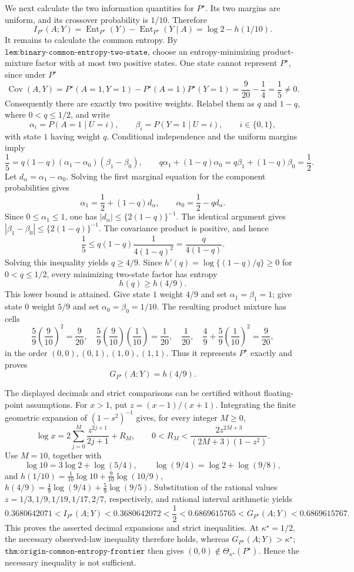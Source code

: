 We next calculate the two information quantities for \(P^\star\).  Its two margins are uniform, and its crossover probability is \(1/10\).  Therefore
\[
 I_{P^\star}(A;Y)=\operatorname{Ent}_{P^\star}(Y)-
 \operatorname{Ent}_{P^\star}(Y\mid A)=\log2-h(1/10).
\]
It remains to calculate the common entropy.  By \(\texttt{lem:binary-common-entropy-two-state}\), choose an entropy-minimizing product-mixture factor with at most two positive states.  One state cannot represent \(P^\star\), since under \(P^\star\)
\[
 \operatorname{Cov}(A,Y)=P^\star(A=1,Y=1)-P^\star(A=1)P^\star(Y=1)
 =\frac9{20}-\frac14=\frac15\ne0.
\]
Consequently there are exactly two positive weights.  Relabel them as \(q\) and \(1-q\), where \(0<q\leq1/2\), and write
\[
 \alpha_i=P(A=1\mid U=i),\qquad
 \beta_i=P(Y=1\mid U=i),\qquad i\in\{0,1\},
\]
with state \(1\) having weight \(q\).  Conditional independence and the uniform margins imply
\[
 \frac15=q(1-q)(\alpha_1-\alpha_0)(\beta_1-\beta_0),
 \qquad q\alpha_1+(1-q)\alpha_0=q\beta_1+(1-q)\beta_0=\frac12.
\]
Let \(d_\alpha=\alpha_1-\alpha_0\).  Solving the first marginal equation for the component probabilities gives
\[
 \alpha_1=\frac12+(1-q)d_\alpha,
 \qquad \alpha_0=\frac12-qd_\alpha.
\]
Since \(0\leq\alpha_1\leq1\), one has \(|d_\alpha|\leq\{2(1-q)\}^{-1}\).  The identical argument gives \(|\beta_1-\beta_0|\leq\{2(1-q)\}^{-1}\).  The covariance product is positive, and hence
\[
 \frac15\leq q(1-q)\frac1{4(1-q)^2}=\frac{q}{4(1-q)}.
\]
Solving this inequality yields \(q\geq4/9\).  Since \(h'(q)=\log\{(1-q)/q\}\geq0\) for \(0<q\leq1/2\), every minimizing two-state factor has entropy
\[
 h(q)\geq h(4/9).
\]
This lower bound is attained.  Give state \(1\) weight \(4/9\) and set \(\alpha_1=\beta_1=1\); give state \(0\) weight \(5/9\) and set \(\alpha_0=\beta_0=1/10\).  The resulting product mixture has cells
\[
 \frac59\left(\frac9{10}\right)^2=\frac9{20},\quad
 \frac59\left(\frac9{10}\right)\left(\frac1{10}\right)=\frac1{20},\quad
 \frac1{20},\quad
 \frac49+\frac59\left(\frac1{10}\right)^2=\frac9{20},
\]
in the order \((0,0),(0,1),(1,0),(1,1)\).  Thus it represents \(P^\star\) exactly and proves
\[
 G_{P^\star}(A;Y)=h(4/9).
\]

The displayed decimals and strict comparisons can be certified without floating-point assumptions.  For \(x>1\), put \(z=(x-1)/(x+1)\).  Integrating the finite geometric expansion of \((1-s^2)^{-1}\) gives, for every integer \(M\geq0\),
\[
 \log x=2\sum_{j=0}^{M}\frac{z^{2j+1}}{2j+1}+R_M,
 \qquad 0<R_M<\frac{2z^{2M+3}}{(2M+3)(1-z^2)}.
\]
Use \(M=10\), together with
\[
 \log10=3\log2+\log(5/4),\qquad
 \log(9/4)=\log2+\log(9/8),
\]
and \(h(1/10)=\tfrac1{10}\log10+\tfrac9{10}\log(10/9)\), \(h(4/9)=\tfrac49\log(9/4)+\tfrac59\log(9/5)\).  Substitution of the rational values \(z=1/3,1/9,1/19,1/17,2/7\), respectively, and rational interval arithmetic yields
\[
 0.3680642071<I_{P^\star}(A;Y)<0.3680642072
 <\frac12
 <0.6869615765<G_{P^\star}(A;Y)<0.6869615767.
\]
This proves the asserted decimal expansions and strict inequalities.  At \(\kappa^\star=1/2\), the necessary observed-law inequality therefore holds, whereas \(G_{P^\star}(A;Y)>\kappa^\star\); \(\texttt{thm:origin-common-entropy-frontier}\) then gives \((0,0)\notin\Theta_{\kappa^\star}(P^\star)\).  Hence the necessary inequality is not sufficient.

